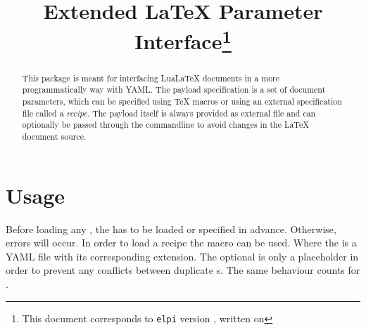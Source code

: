 \documentclass{ltxdoc}
\begin{document}
    \title{Extended \LaTeX{} Parameter Interface\thanks{This document corresponds to \texttt{elpi} version \gitversion, written on \gitdate}}
    \maketitle

    \begin{abstract}
        This package is meant for interfacing Lua\LaTeX{} documents in a more programmatically way with YAML\@.
        The payload specification is a set of document parameters, which can be specified using \TeX{} macros or using an external specification file called a \textit{recipe}.
        The payload itself is always provided as external file and can optionally be passed through the commandline to avoid changes in the \LaTeX{} document source.
    \end{abstract}

    \section{Usage}
    Before loading any , the  has to be loaded or specified in advance.
    Otherwise, errors will occur.
    \DescribeMacro{\loadrecipe}
    In order to load a recipe the macro \cmd{\loadrecipe} can be used.
    Where the  is a YAML file with its corresponding extension.
    The optional  is only a placeholder in order to prevent any conflicts between duplicate s.
    \DescribeMacro{\loadpayload} The same behaviour counts for \cmd{\loadpayload}.

    \clearpage
\end{document}

